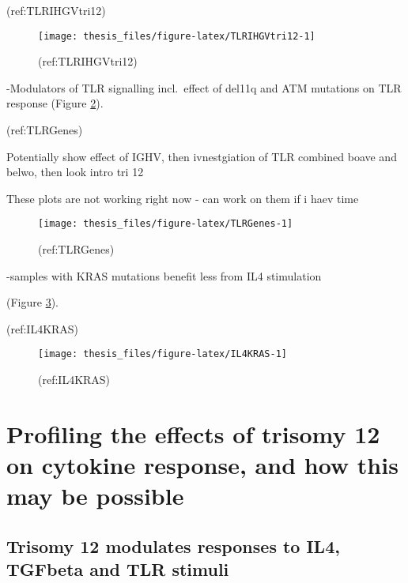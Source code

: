 \documentclass[11pt, a4paper, twosided]{book}
\begin{document}
(ref:TLRIHGVtri12)
\begin{figure}

{\centering \texttt{[image: thesis\_files/figure-latex/TLRIHGVtri12-1]} 

}

\caption{(ref:TLRIHGVtri12)}\label{fig:TLRIHGVtri12}
\end{figure}
-Modulators of TLR signalling incl.~effect of del11q and ATM mutations on TLR response
(Figure \ref{fig:TLRGenes}).

(ref:TLRGenes)

Potentially show effect of IGHV, then ivnestgiation of TLR combined boave and belwo, then look intro tri 12

These plots are not working right now - can work on them if i haev time
\begin{figure}

{\centering \texttt{[image: thesis\_files/figure-latex/TLRGenes-1]} 

}

\caption{(ref:TLRGenes)}\label{fig:TLRGenes}
\end{figure}
-samples with KRAS mutations benefit less from IL4 stimulation

(Figure \ref{fig:IL4KRAS}).

(ref:IL4KRAS)
\begin{figure}

{\centering \texttt{[image: thesis\_files/figure-latex/IL4KRAS-1]} 

}

\caption{(ref:IL4KRAS)}\label{fig:IL4KRAS}
\end{figure}
\hypertarget{profiling-the-effects-of-trisomy-12-on-cytokine-response-and-how-this-may-be-possible}{%
\section{Profiling the effects of trisomy 12 on cytokine response, and how this may be possible}\label{profiling-the-effects-of-trisomy-12-on-cytokine-response-and-how-this-may-be-possible}}

\hypertarget{trisomy-12-modulates-responses-to-il4-tgfbeta-and-tlr-stimuli}{%
\subsection{Trisomy 12 modulates responses to IL4, TGFbeta and TLR stimuli}\label{trisomy-12-modulates-responses-to-il4-tgfbeta-and-tlr-stimuli}}
\end{document}
